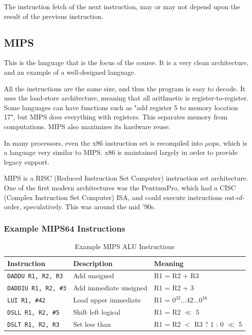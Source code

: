 \documentclass{article}
\begin{document}
 The instruction fetch of the next instruction, may or may not depend upon the result of the previous instruction.

\subsection{MIPS}

This is the language that is the focus of the course. It is a very clean architecture, and an example of a well-designed language. 

All the instructions are the same size, and thus the program is easy to decode. It uses the load-store architecture, meaning that all arithmetic is register-to-register. Some languages can have functions such as "add register 5 to memory location 17", but MIPS does everything with registers. This separates memory from computations. MIPS also maximizes its hardware reuse. 

In many processors, even the x86 instruction set is recompiled into $\mu$ops, which is a language very similar to MIPS. x86 is maintained largely in order to provide legacy support.

MIPS is a RISC (Reduced Instruction Set Computer) instruction set architecture. One of the first modern architectures was the PentiumPro, which had a CISC (Complex Instruction Set Computer) ISA, and could execute instructions out-of-order, speculatively. This was around the mid '90s.

\subsubsection{Example MIPS64 Instructions}

\begin{table}[ht]
  \centering
  \caption{Example MIPS ALU Instructions}
  \begin{tabular}{
  		>{}m{1.3in} 
  		>{}m{1.5in} 
  		>{}m{1.7in}
  		}
    \toprule
    \textbf{Instruction} & \textbf{Description} & \textbf{Meaning}  \\ 
    \midrule
	\texttt{DADDU R1, R2, R3} & Add unsigned &  R1 = R2 + R3	\\
		\texttt{DADDIU R1, R2, \#3} & Add immediate unsigned &  R1 = R2 + 3	\\
	\texttt{LUI R1, \#42} & Load upper immediate & R1 =  $0^{32}$...42...$0^{16}$ 	\\
	\texttt{DSLL R1, R2, \#5} & Shift left logical &  R1 = R2 $\ll$ 5	\\
	\texttt{DSLT R1, R2, R3} & Set less than &  R1 = R2 $<$ R3 ? 1 : 0 $\ll$ 5	\\

	\bottomrule
  \end{tabular}
\end{table}
\end{document}
